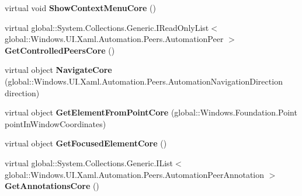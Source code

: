 \begin{DoxyCompactItemize}
\item 
\mbox{\label{class_windows_1_1_u_i_1_1_xaml_1_1_automation_1_1_peers_1_1_automation_peer_a4cf8c7b7bc669694fbf6115b9d508e66}} 
virtual void {\bfseries Show\+Context\+Menu\+Core} ()
\item 
\mbox{\label{class_windows_1_1_u_i_1_1_xaml_1_1_automation_1_1_peers_1_1_automation_peer_a7554757fd9d004f2179de9d68645070c}} 
virtual global\+::\+System.\+Collections.\+Generic.\+I\+Read\+Only\+List$<$ global\+::\+Windows.\+U\+I.\+Xaml.\+Automation.\+Peers.\+Automation\+Peer $>$ {\bfseries Get\+Controlled\+Peers\+Core} ()
\item 
\mbox{\label{class_windows_1_1_u_i_1_1_xaml_1_1_automation_1_1_peers_1_1_automation_peer_afd50c2697f066ad333995dc06a907be4}} 
virtual object {\bfseries Navigate\+Core} (global\+::\+Windows.\+U\+I.\+Xaml.\+Automation.\+Peers.\+Automation\+Navigation\+Direction direction)
\item 
\mbox{\label{class_windows_1_1_u_i_1_1_xaml_1_1_automation_1_1_peers_1_1_automation_peer_ae8260393672adea30e509cee8106d5ef}} 
virtual object {\bfseries Get\+Element\+From\+Point\+Core} (global\+::\+Windows.\+Foundation.\+Point point\+In\+Window\+Coordinates)
\item 
\mbox{\label{class_windows_1_1_u_i_1_1_xaml_1_1_automation_1_1_peers_1_1_automation_peer_afadb1e1f2c9abb79fa5e7189b24f159c}} 
virtual object {\bfseries Get\+Focused\+Element\+Core} ()
\item 
\mbox{\label{class_windows_1_1_u_i_1_1_xaml_1_1_automation_1_1_peers_1_1_automation_peer_ab6f0d05047a23ceac4c1969ba5a531c6}} 
virtual global\+::\+System.\+Collections.\+Generic.\+I\+List$<$ global\+::\+Windows.\+U\+I.\+Xaml.\+Automation.\+Peers.\+Automation\+Peer\+Annotation $>$ {\bfseries Get\+Annotations\+Core} ()
\item 

\end{DoxyCompactItemize}
